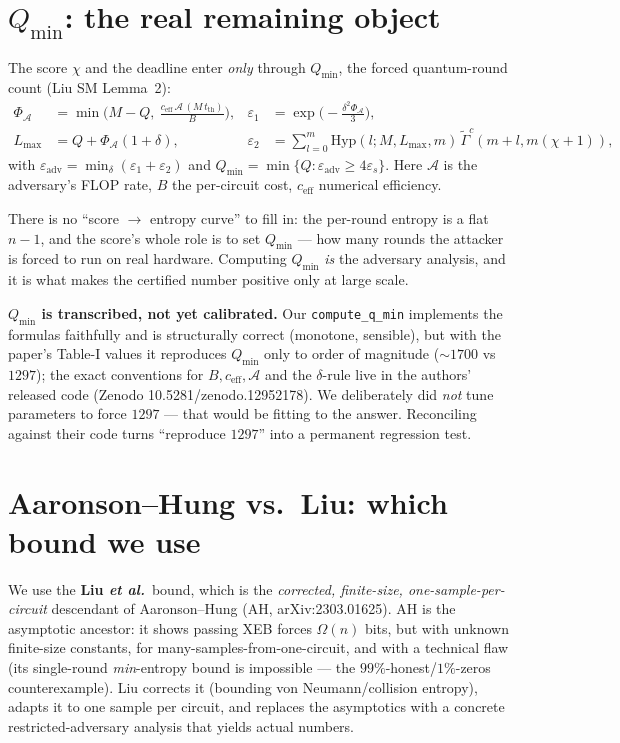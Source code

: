 \documentclass[11pt]{article}
\theoremstyle{definition}
\theoremstyle{plain}
\newcommand{\epss}{\varepsilon_{s}}
\newcommand{\Qmin}{Q_{\min}}
\begin{document}
\section{$\Qmin$: the real remaining object}
The score $\chi$ and the deadline enter \emph{only} through $\Qmin$, the forced
quantum-round count (Liu SM Lemma~2):
\begin{align*}
\Phi_{\mathcal A}&=\min\!\Big(M-Q,\ \tfrac{c_{\mathrm{eff}}\,\mathcal A\,(M\,t_{\mathrm{th}})}{B}\Big), &
\varepsilon_1&=\exp\!\big(-\tfrac{\delta^2\Phi_{\mathcal A}}{3}\big),\\
L_{\max}&=Q+\Phi_{\mathcal A}(1+\delta), &
\varepsilon_2&=\textstyle\sum_{l=0}^m \mathrm{Hyp}(l;M,L_{\max},m)\,\widetilde\Gamma^{c}(m{+}l,m(\chi{+}1)),
\end{align*}
with $\varepsilon_{\mathrm{adv}}=\min_\delta(\varepsilon_1+\varepsilon_2)$ and
$\Qmin=\min\{Q:\varepsilon_{\mathrm{adv}}\ge4\epss\}$. Here $\mathcal A$ is the adversary's
FLOP rate, $B$ the per-circuit cost, $c_{\mathrm{eff}}$ numerical efficiency.

\begin{plain}
There is no ``score $\to$ entropy curve'' to fill in: the per-round entropy is a flat
$n-1$, and the score's whole role is to set $\Qmin$ --- how many rounds the attacker is
forced to run on real hardware. Computing $\Qmin$ \emph{is} the adversary analysis, and it
is what makes the certified number positive only at large scale.
\end{plain}

\begin{warnbox}
\textbf{$\Qmin$ is transcribed, not yet calibrated.} Our \texttt{compute\_q\_min} implements
the formulas faithfully and is structurally correct (monotone, sensible), but with the
paper's Table-I values it reproduces $\Qmin$ only to order of magnitude ($\sim1700$ vs
$1297$); the exact conventions for $B,c_{\mathrm{eff}},\mathcal A$ and the $\delta$-rule live
in the authors' released code (Zenodo 10.5281/zenodo.12952178). We deliberately did
\emph{not} tune parameters to force $1297$ --- that would be fitting to the answer.
Reconciling against their code turns ``reproduce $1297$'' into a permanent regression test.
\end{warnbox}

\section{Aaronson--Hung vs.\ Liu: which bound we use}
We use the \textbf{Liu \emph{et al.}}\ bound, which is the \emph{corrected, finite-size,
one-sample-per-circuit} descendant of Aaronson--Hung (AH, arXiv:2303.01625). AH is the
asymptotic ancestor: it shows passing XEB forces $\Omega(n)$ bits, but with unknown
finite-size constants, for many-samples-from-one-circuit, and with a technical flaw (its
single-round \emph{min}-entropy bound is impossible --- the $99\%$-honest/$1\%$-zeros
counterexample). Liu corrects it (bounding von Neumann/collision entropy), adapts it to one
sample per circuit, and replaces the asymptotics with a concrete restricted-adversary
analysis that yields actual numbers.
\end{document}

